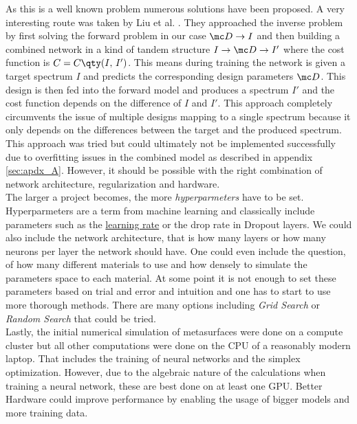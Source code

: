 \indent As this is a well known problem numerous solutions have been proposed. A very interesting route was taken by Liu et al. \cite{Liu2018}. They approached the inverse problem by first solving the forward problem in our case $\mc D \rightarrow I$ and then building a combined network in a kind of tandem structure 
$I \rightarrow \mc D \rightarrow I'$
where the cost function is 
$C = C \qty(I, \, I')$.
This means during training the network is given a target spectrum $I$ and predicts the corresponding design parameters $\mc D$. This design is then fed into the forward model and produces a spectrum $I'$ and the cost function depends on the difference of $I$ and $I'$. This approach completely circumvents the issue of multiple designs mapping to a single spectrum because it only depends on the differences between the target and the produced spectrum. This approach was tried but could ultimately not be implemented successfully due to overfitting issues in the combined model as described in appendix \ref{sec:apdx_A}. However, it should be possible with the right combination of network architecture, regularization and hardware.
\\    

\indent
The larger a project becomes, the more \textit{hyperparmeters} have to be set. Hyperparmeters are a term from machine learning and classically include parameters such as the \hyperref[hyp:learnigrate]{learning rate} or the drop rate in Dropout layers. We could also include the network architecture, that is how many layers or how many neurons per layer the network should have. One could even include the question, of how many different materials to use and how densely to simulate the parameters space to each material.
At some point it is not enough to set these parameters based on trial and error and intuition and one has to start to use more thorough methods. There are many options including \textit{Grid Search} or \textit{Random Search} \cite{RandomSearch} that could be tried.
\\

\indent
Lastly, the initial numerical simulation of metasurfaces were done on a compute cluster but all other computations were done on the CPU of a reasonably modern laptop. That includes the training of neural networks and the simplex optimization. However, due to the algebraic nature of the calculations when training a neural network, these are best done on at least one GPU. Better Hardware could improve performance by enabling the usage of bigger models and more training data. 
\\

\indent

